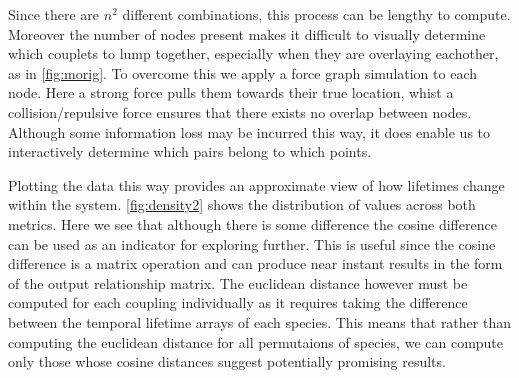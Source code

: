 Since there are $n^2$ different combinations, this process can be lengthy to compute. Moreover the number of nodes present makes it difficult to visually determine which couplets to lump together, especially when they are overlaying eachother, as in \autoref{fig:morig}. To overcome this we apply a force graph simulation to each node. Here a strong force pulls them towards their true location, whist a collision/repulsive force ensures that there exists no overlap between nodes. Although some information loss may be incurred this way, it does enable us to interactively determine which pairs belong to which points.   

Plotting the data this way provides an approximate view of how lifetimes change within the system. \autoref{fig:density2} shows the distribution of values across both metrics. Here we see that although there is some difference the cosine difference can be used as an indicator for exploring further. This is useful since the cosine difference is a matrix operation and can produce near instant results in the form of the output relationship matrix. The euclidean distance however must be computed for each coupling individually as it requires taking the difference between the temporal lifetime arrays of each species. This means that rather than computing the euclidean distance for all permutaions of species, we can compute only those whose cosine distances suggest potentially promising results.  



